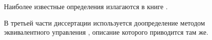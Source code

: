 Наиболее известные определения излагаются в книге \cite[\S 4]{Filippov1988}.

В третьей части диссертации используется доопределение методом эквивалентного управления \cite{Utkin1981}, описание которого приводится там же.

\bigskip

%

